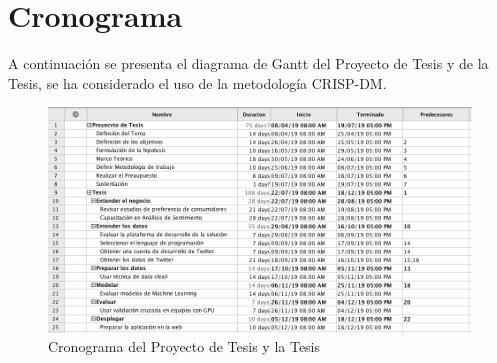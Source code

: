 %
\chapter{Cronograma}

A continuaci\'on se presenta el diagrama de Gantt del Proyecto de Tesis y de la Tesis, se ha considerado el uso de la metodolog\'ia CRISP-DM.

\begin{figure}[H]
\centering
\includegraphics[scale=0.45]{chapters/img/Ch07_schedule.PNG}
\caption{Cronograma del Proyecto de Tesis y la Tesis}
\end{figure}


\cleardoublepage